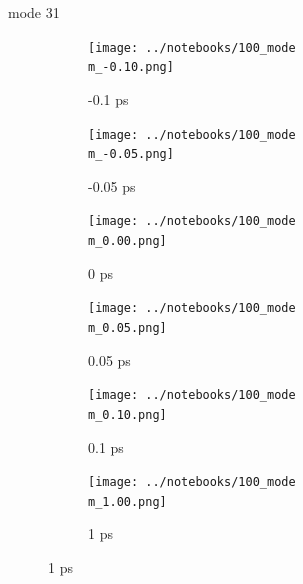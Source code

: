 \documentclass{beamer}
\begin{document}
\renewcommand\m{31}
\begin{frame}{mode \m}
	\begin{figure}
		\centering
		\begin{subfigure}[b]{\w\textwidth}
			\centering
			\texttt{[image: ../notebooks/100\_mode\\m\_-0.10.png]}
			\caption{-0.1 ps}
		\end{subfigure}
		\begin{subfigure}[b]{\w\textwidth}
			\centering
			\texttt{[image: ../notebooks/100\_mode\\m\_-0.05.png]}
			\caption{-0.05 ps}
		\end{subfigure}
		\begin{subfigure}[b]{\w\textwidth}
			\centering
			\texttt{[image: ../notebooks/100\_mode\\m\_0.00.png]}
			\caption{0 ps}
		\end{subfigure}
		\begin{subfigure}[b]{\w\textwidth}
			\centering
			\texttt{[image: ../notebooks/100\_mode\\m\_0.05.png]}
			\caption{0.05 ps}
		\end{subfigure}
		\begin{subfigure}[b]{\w\textwidth}
			\centering
			\texttt{[image: ../notebooks/100\_mode\\m\_0.10.png]}
			\caption{0.1 ps}
		\end{subfigure}
		\begin{subfigure}[b]{\w\textwidth}
			\centering
			\texttt{[image: ../notebooks/100\_mode\\m\_1.00.png]}
			\caption{1 ps}
		\end{subfigure}
	\end{figure}
\end{frame}
\end{document}
